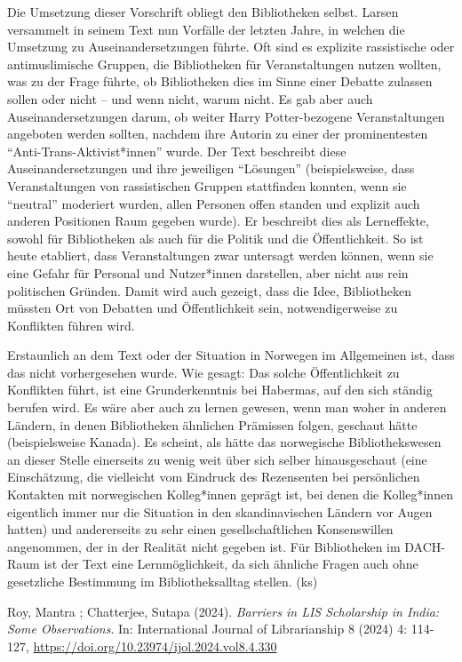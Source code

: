 \documentclass[a4paper,
fontsize=11pt,
oneside,
numbers=noperiodatend,
parskip=half-,
bibliography=totoc,
final
]{scrartcl}
\begin{document}
Die Umsetzung dieser Vorschrift obliegt den Bibliotheken selbst. Larsen
versammelt in seinem Text nun Vorfälle der letzten Jahre, in welchen die
Umsetzung zu Auseinandersetzungen führte. Oft sind es explizite
rassistische oder antimuslimische Gruppen, die Bibliotheken für
Veranstaltungen nutzen wollten, was zu der Frage führte, ob Bibliotheken
dies im Sinne einer Debatte zulassen sollen oder nicht -- und wenn
nicht, warum nicht. Es gab aber auch Auseinandersetzungen darum, ob
weiter Harry Potter-bezogene Veranstaltungen angeboten werden sollten,
nachdem ihre Autorin zu einer der prominentesten
\enquote{Anti-Trans-Aktivist*innen} wurde. Der Text beschreibt diese
Auseinandersetzungen und ihre jeweiligen \enquote{Lösungen}
(beispielsweise, dass Veranstaltungen von rassistischen Gruppen
stattfinden konnten, wenn sie \enquote{neutral} moderiert wurden, allen
Personen offen standen und explizit auch anderen Positionen Raum gegeben
wurde). Er beschreibt dies als Lerneffekte, sowohl für Bibliotheken als
auch für die Politik und die Öffentlichkeit. So ist heute etabliert,
dass Veranstaltungen zwar untersagt werden können, wenn sie eine Gefahr
für Personal und Nutzer*innen darstellen, aber nicht aus rein
politischen Gründen. Damit wird auch gezeigt, dass die Idee,
Bibliotheken müssten Ort von Debatten und Öffentlichkeit sein,
notwendigerweise zu Konflikten führen wird.

Erstaunlich an dem Text oder der Situation in Norwegen im Allgemeinen
ist, dass das nicht vorhergesehen wurde. Wie gesagt: Das solche
Öffentlichkeit zu Konflikten führt, ist eine Grunderkenntnis bei
Habermas, auf den sich ständig berufen wird. Es wäre aber auch zu lernen
gewesen, wenn man woher in anderen Ländern, in denen Bibliotheken
ähnlichen Prämissen folgen, geschaut hätte (beispielsweise Kanada). Es
scheint, als hätte das norwegische Bibliothekswesen an dieser Stelle
einerseits zu wenig weit über sich selber hinausgeschaut (eine
Einschätzung, die vielleicht vom Eindruck des Rezensenten bei
persönlichen Kontakten mit norwegischen Kolleg*innen geprägt ist, bei
denen die Kolleg*innen eigentlich immer nur die Situation in den
skandinavischen Ländern vor Augen hatten) und andererseits zu sehr einen
gesellschaftlichen Konsenswillen angenommen, der in der Realität nicht
gegeben ist. Für Bibliotheken im DACH-Raum ist der Text eine
Lernmöglichkeit, da sich ähnliche Fragen auch ohne gesetzliche
Bestimmung im Bibliotheksalltag stellen. (ks)

Roy, Mantra ; Chatterjee, Sutapa (2024). \emph{Barriers in LIS
Scholarship in India: Some Observations}. In: International Journal of
Librarianship 8 (2024) 4: 114-127,
\url{https://doi.org/10.23974/ijol.2024.vol8.4.330}
\end{document}
